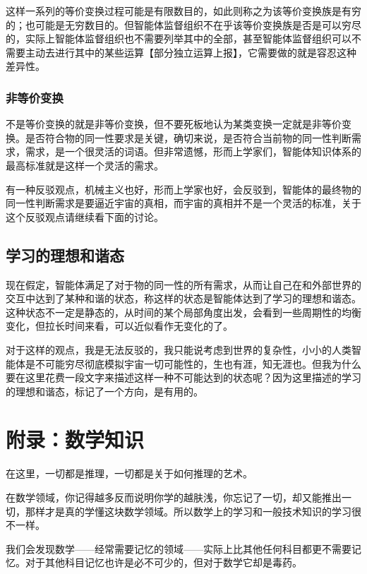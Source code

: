 \documentclass[12pt,oneside]{book}
\begin{document}
这样一系列的等价变换过程可能是有限数目的，如此则称之为该等价变换族是有穷的；也可能是无穷数目的。但智能体监督组织不在乎该等价变换族是否是可以穷尽的，实际上智能体监督组织也不需要列举其中的全部，甚至智能体监督组织可以不需要主动去进行其中的某些运算【部分独立运算上报】，它需要做的就是容忍这种差异性。


\section{非等价变换}
不是等价变换的就是非等价变换，但不要死板地认为某类变换一定就是非等价变换。是否符合物的同一性要求是关键，确切来说，是否符合当前物的同一性判断需求，需求，是一个很灵活的词语。但非常遗憾，形而上学家们，智能体知识体系的最高标准就是这样一个灵活的需求。

有一种反驳观点，机械主义也好，形而上学家也好，会反驳到，智能体的最终物的同一性判断需求是要逼近宇宙的真相，而宇宙的真相并不是一个灵活的标准，关于这个反驳观点请继续看下面的讨论。

\chapter{学习的理想和谐态}
现在假定，智能体满足了对于物的同一性的所有需求，从而让自己在和外部世界的交互中达到了某种和谐的状态，称这样的状态是智能体达到了学习的理想和谐态。这种状态不一定是静态的，从时间的某个局部角度出发，会看到一些周期性的均衡变化，但拉长时间来看，可以近似看作无变化的了。

对于这样的观点，我是无法反驳的，我只能说考虑到世界的复杂性，小小的人类智能体是不可能穷尽彻底模拟宇宙一切可能性的，生也有涯，知无涯也。但我为什么要在这里花费一段文字来描述这样一种不可能达到的状态呢？因为这里描述的学习的理想和谐态，标记了一个方向，是有用的。




\part{附录：数学知识}
在这里，一切都是推理，一切都是关于如何推理的艺术。

在数学领域，你记得越多反而说明你学的越肤浅，你忘记了一切，却又能推出一切，那样才是真的学懂这块数学领域。所以数学上的学习和一般技术知识的学习很不一样。

\begin{bookref}[frametitle={\cite{烧掉数学书}}]
我们会发现数学——经常需要记忆的领域——实际上比其他任何科目都更不需要记忆。对于其他科目记忆也许是必不可少的，但对于数学它却是毒药。
\end{bookref}
\end{document}
